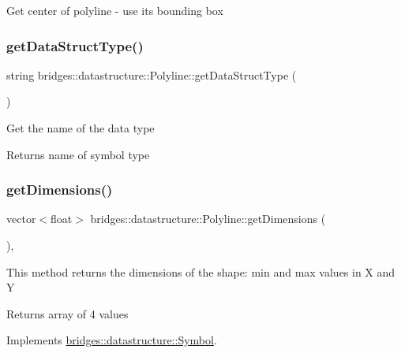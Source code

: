 Get center of polyline -\/ use its bounding box \mbox{\label{classbridges_1_1datastructure_1_1_polyline_a49b37ad55cf64fe759ee5a0f46e2e0cc}} 
\subsubsection{\texorpdfstring{getDataStructType()}{getDataStructType()}}
{\footnotesize\ttfamily string bridges\+::datastructure\+::\+Polyline\+::get\+Data\+Struct\+Type (\begin{DoxyParamCaption}{ }\end{DoxyParamCaption})\hspace{0.3cm}{\ttfamily [inline]}}

Get the name of the data type \begin{DoxyReturn}{Returns}
name of symbol type 
\end{DoxyReturn}
\mbox{\label{classbridges_1_1datastructure_1_1_polyline_aebcd7f4f80e2eed35057e5b1d82ba4e7}} 
\subsubsection{\texorpdfstring{getDimensions()}{getDimensions()}}
{\footnotesize\ttfamily vector$<$float$>$ bridges\+::datastructure\+::\+Polyline\+::get\+Dimensions (\begin{DoxyParamCaption}{ }\end{DoxyParamCaption})\hspace{0.3cm}{\ttfamily [inline]}, {\ttfamily [virtual]}}

This method returns the dimensions of the shape\+: min and max values in X and Y

\begin{DoxyReturn}{Returns}
array of 4 values 
\end{DoxyReturn}


Implements \mbox{\hyperlink{classbridges_1_1datastructure_1_1_symbol_a37ba60b6acdd0888677eb8c64a931679}{bridges\+::datastructure\+::\+Symbol}}.

